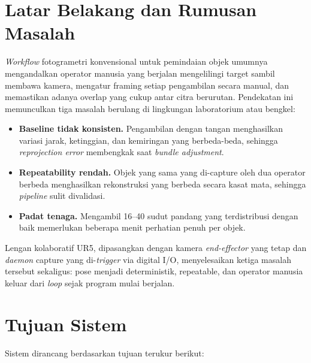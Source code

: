 \documentclass[11pt,a4paper]{article}
\begin{document}
\section{Latar Belakang dan Rumusan Masalah}

\textit{Workflow} fotogrametri konvensional untuk pemindaian objek umumnya mengandalkan operator manusia yang berjalan mengelilingi target sambil membawa kamera, mengatur framing setiap pengambilan secara manual, dan memastikan adanya overlap yang cukup antar citra berurutan. Pendekatan ini memunculkan tiga masalah berulang di lingkungan laboratorium atau bengkel:

\begin{itemize}[leftmargin=1.4em,itemsep=2pt]
    \item \textbf{Baseline tidak konsisten.} Pengambilan dengan tangan menghasilkan variasi jarak, ketinggian, dan kemiringan yang berbeda-beda, sehingga \textit{reprojection error} membengkak saat \textit{bundle adjustment}.
    \item \textbf{Repeatability rendah.} Objek yang sama yang di-capture oleh dua operator berbeda menghasilkan rekonstruksi yang berbeda secara kasat mata, sehingga \textit{pipeline} sulit divalidasi.
    \item \textbf{Padat tenaga.} Mengambil 16--40 sudut pandang yang terdistribusi dengan baik memerlukan beberapa menit perhatian penuh per objek.
\end{itemize}

Lengan kolaboratif UR5, dipasangkan dengan kamera \textit{end-effector} yang tetap dan \textit{daemon} capture yang di-\textit{trigger} via digital I/O, menyelesaikan ketiga masalah tersebut sekaligus: pose menjadi deterministik, repeatable, dan operator manusia keluar dari \textit{loop} sejak program mulai berjalan.

\section{Tujuan Sistem}

Sistem dirancang berdasarkan tujuan terukur berikut:
\end{document}
